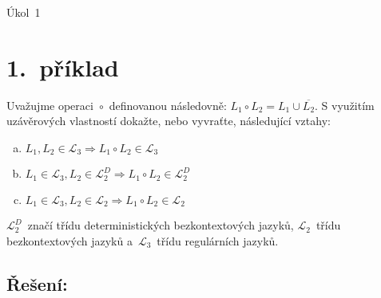 \documentclass[a4paper, 11pt]{scrartcl}
\newcommand{\NUMBER}{1}
\begin{document}
    \begin{center}
        {\Large Úkol~\NUMBER}
    \end{center}


    \section*{1.~příklad}

    Uvažujme operaci~$ \circ $~definovanou následovně: $ L_1 \circ L_2 = L_1
    \cup \overline{L_2} $. S využitím uzávěrových vlastností dokažte, nebo
    vyvraťte, následující vztahy:
    \begin{enumerate}[(a)]
        \item
            $ L_1, L_2 \in \mathcal{L}_3 \Rightarrow L_1 \circ L_2 \in
            \mathcal{L}_3 $

        \item
            $ L_1 \in \mathcal{L}_3, L_2 \in \mathcal{L}_2^D \Rightarrow L_1
            \circ L_2 \in \mathcal{L}_2^D $

        \item
            $ L_1 \in \mathcal{L}_3, L_2 \in \mathcal{L}_2 \Rightarrow L_1
            \circ L_2 \in \mathcal{L}_2 $
    \end{enumerate}
    $ \mathcal{L}_2^D $~značí třídu deterministických bezkontextových jazyků,
    $ \mathcal{L}_2 $~třídu bezkontextových jazyků a~$ \mathcal{L}_3 $~třídu
    regulárních jazyků.

    \subsection*{Řešení:}
\end{document}
